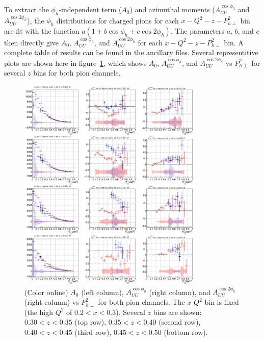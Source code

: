 \documentclass[aps,prl,twocolumn,showpacs,superscriptaddress,groupedaddress]{revtex4}  %
\begin{document}
To extract the $\phi_h$-independent term ($A_0$) and azimuthal moments ($A_{UU}^{\cos\phi_h}$ and $A_{UU}^{\cos 2\phi_h}$), the $\phi_h$ distributions for charged pions for each $x-Q^2-z-P_{h\perp}^2$ bin are fit with the function $a(1 + b\cos\phi_h + c\cos 2\phi_h)$.
The parameters $a$, $b$, and $c$ then directly give $A_0$, $A_{UU}^{\cos\phi_h}$, and $A_{UU}^{\cos 2\phi_h}$ for each $x-Q^2-z-P_{h\perp}^2$ bin.
A complete table of results can be found in the ancillary files.
Several representitive plots are shown here in figure~\ref{fig:A0AcAcc_zPT2bins_x1QQ1_final}, which shows $A_0$, $A_{UU}^{\cos\phi_h}$, and $A_{UU}^{\cos 2\phi_h}$ vs $P_{h\perp}^2$ for several $z$ bins for both pion channels.
%
\begin{figure}[htp]
\centering
\includegraphics[width=3.5in]{plots/A0AcAcc_zPT2bins_x1QQ1_final.png}
\caption{(Color online) $A_0$ (left column), $A_{UU}^{\cos\phi_h}$ (right column), and $A_{UU}^{\cos 2\phi_h}$ (right column) vs $P_{h\perp}^2$ for both pion channels. The $x$-$Q^2$ bin is fixed (the high $Q^2$ of $0.2 < x < 0.3$). Several $z$ bins are shown: $0.30 < z < 0.35$ (top row), $0.35 < z < 0.40$ (second row), $0.40 < z < 0.45$ (third row), $0.45 < z < 0.50$ (bottom row).}
\label{fig:A0AcAcc_zPT2bins_x1QQ1_final}
\end{figure}
\end{document}
